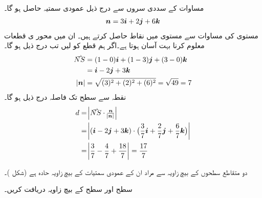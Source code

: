 مساوات  کے سددی سروں سے درج ذیل عمودی سمتیہ حاصل ہو گا۔
\begin{align*}
{\ensuremath{{\boldsymbol{n}}}}=3{\boldsymbol{i}}+2{\boldsymbol{j}}+6{\boldsymbol{k}}
\end{align*}
مستوی کی مساوات سے مستوی میں  نقاط حاصل کرتے ہیں۔ ان میں  محور ی  قطعات  معلوم کرنا بہت آسان ہوتا ہے۔اگر ہم قطع   کو  لیں تب درج ذیل ہو گا۔
\begin{align*}
\krightharpoonup{NS}&=(1-0)\ai+(1-3)\aj+(3-0)\ak\\
&=\ai-2\aj+3\ak\\
\abs{\kvec{n}}&=\sqrt{(3)^2+(2)^2+(6)^2}=\sqrt{49}=7
\end{align*} 
نقطہ  سے  سطح  تک فاصلہ درج ذیل ہو گا۔
\begin{align*}
d&=\abs{\krightharpoonup{NS}\cdot\tfrac{\kvec{n}}{\abs{\kvec{n}}}}\\
&=\abs{(\ai-2\aj+3\ak)\cdot\big(\frac{3}{7}\ai+\frac{2}{7}\aj+\frac{6}{7}\ak\big)}\\
&=\abs{\frac{3}{7}-\frac{4}{7}+\frac{18}{7}}=\frac{17}{7}
\end{align*}

دو متقاطع سطحوں کے بیچ زاویہ سے مراد ان کے عمودی سمتیات کے بیچ  زاویہ حادہ ہے (شکل )۔

سطح  اور سطح  کے بیچ زاویہ دریافت کریں۔

